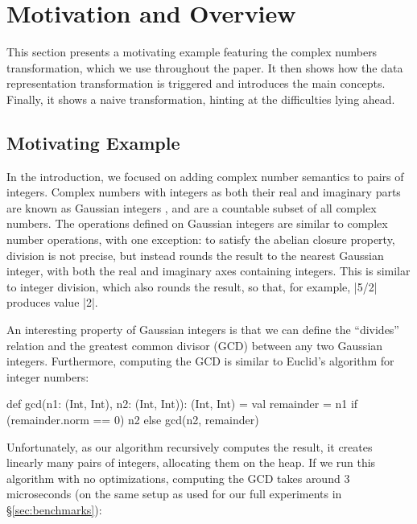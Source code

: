 \vspace{-0.9em}

\section{Motivation and Overview}
\label{sec:problem}

\vspace{-0.2em}

This section presents a motivating example featuring the complex numbers transformation, which we use throughout the paper. It then shows how the data representation transformation is triggered and introduces the main concepts. Finally, it shows a naive transformation, hinting at the difficulties lying ahead.

\vspace{-0.6em}

\subsection{Motivating Example}

\vspace{-0.2em}

In the introduction, we focused on adding complex number semantics to pairs of integers. Complex numbers with integers as both their real and imaginary parts are known as Gaussian integers \cite{gauss1828theoria,gaussian-integers-wikipedia}, and are a countable subset of all complex numbers. The operations defined on Gaussian integers are similar to complex number operations, with one
exception: to satisfy the abelian closure property, division is not precise, but instead rounds the result to the nearest Gaussian integer, with both the real and imaginary axes containing integers. This is similar to integer division, which also rounds the result, so that, for example, |5/2| produces value |2|.

An interesting property of Gaussian integers is that we can define the ``divides'' relation and the greatest common divisor (GCD) between any two Gaussian integers. Furthermore, computing the GCD is similar to
Euclid's algorithm for integer numbers:

\begin{lstlisting-nobreak}
def gcd(n1: (Int, Int), n2: (Int, Int)): (Int, Int) = {
  val remainder = n1 %
  if (remainder.norm == 0) n2 else gcd(n2, remainder)
}
\end{lstlisting-nobreak}

Unfortunately, as our algorithm recursively computes the result, it creates linearly many pairs of integers, allocating them on the heap. If we run this algorithm with no optimizations, computing the GCD takes around 3 microseconds (on the same setup as used for our full experiments in \S\ref{sec:benchmarks}):

